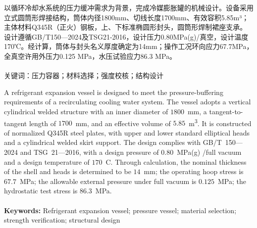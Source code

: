 
\begin{cnabstract} 
  以循环冷却水系统的压力缓冲需求为背景，完成冷媒膨胀罐的机械设计。设备采用立式圆筒形焊接结构，筒体内径1800mm、切线长度1700mm、有效容积5.85m³；主体材料Q345R（正火）钢板，上、下标准椭圆形封头，圆筒形焊制裙座支承。设计遵循GB/T150—2024及TSG21-2016，设计压力$0.80$MPa(g)/真空，设计温度170℃。经计算，筒体与封头名义厚度确定为14mm；操作工况环向应力67.7MPa，全真空许用外压力0.125 MPa，水压试验应力86.3 MPa。
 \\
 \\
 \heiti 关键词：\songti 压力容器；材料选择；强度校核；结构设计
\end{cnabstract} 
  
\begin{enabstract}
  A refrigerant expansion vessel is designed to meet the pressure-buffering requirements of a recirculating cooling water system. The vessel adopts a vertical cylindrical welded structure with an inner diameter of $1800$~mm, a tangent-to-tangent length of $1700$~mm, and an effective volume of $5.85$~m\textsuperscript{3}. It is constructed of normalized Q345R steel plates, with upper and lower standard elliptical heads and a cylindrical welded skirt support. The design complies with GB/T~150—2024 and TSG~21—2016, with a design pressure of $0.80$~MPa(g) /full vacuum and a design temperature of $170$~\textdegree{}C. Through calculation, the nominal thickness of the shell and heads is determined to be $14$~mm; the operating hoop stress is $67.7$~MPa; the allowable external pressure under full vacuum is $0.125$~MPa; the hydrostatic test stress is $86.3$~MPa.
  \\
  \\
  \textbf{Keywords:} Refrigerant expansion vessel; pressure vessel; material selection; strength verification; structural design
\end{enabstract}
